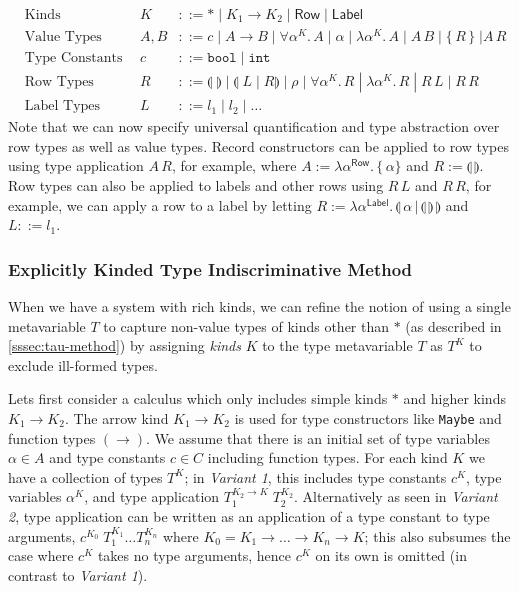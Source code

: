 \documentclass[acmsmall, 9pt]{article}
\begin{document}
\begin{enumerate}
  \begin{align*}
  &\text{Kinds} \quad &K &::= * \; | \; K_1 \rightarrow K_2 \; | \; \mathsf{Row} \; | \; \mathsf{Label}\\
  &\text{Value Types} \quad  &A, B &::= c \; | \; A \rightarrow B \; | \; \forall \alpha^K . \, A\; | \; \alpha \; | \; \lambda \alpha^K. \, A \; | \; A \, B \; | \; \{\,R\,\} \; | A \, R\\
  &\text{Type Constants} \quad &c &::= \texttt{bool} \; | \; \texttt{int}\\
  &\text{Row Types} \quad &R &::= \llparenthesis \; \rrparenthesis \; | \; \llparenthesis \; L \; | \; R \rrparenthesis \; | \; \rho \; | \; \forall \alpha^K . \, R \; | \; \lambda \alpha^K. \, R \; | \; R \, L \; | \; R \, R\\
  &\text{Label Types} \quad &L &::= l_1 \; | \; l_2 \; | \; \ldots
  \end{align*}
  Note that we can now specify universal quantification and type abstraction over row types as well as value types. Record constructors can be applied to row types using type application $A\,R$, for example, where $A := \lambda\alpha^\mathsf{Row}.\,\{\,\alpha\}$ and $R := \llparenthesis \, \rrparenthesis$. Row types can also be applied to labels and other rows using $R\,L$ and $R\,R$, for example, we can apply a row to a label by letting $R := \lambda \alpha^\mathsf{Label}. \, \llparenthesis \, \alpha \, | \, \llparenthesis \, \rrparenthesis \, \rrparenthesis$ and $L ::= l_1$.
\end{enumerate}

\subsubsection{\textbullet \; Explicitly Kinded Type Indiscriminative Method \cite{leijen2005extensible}}
When we have a system with rich kinds, we can refine the notion of using a single metavariable $T$ to capture non-value types of kinds other than $*$ (as described in \ref{sssec:tau-method}) by assigning \textit{kinds} $K$ to the type metavariable $T$ as $T^K$ to exclude ill-formed types.

Lets first consider a calculus which only includes simple kinds $*$ and higher kinds $K_1 \rightarrow K_2$. The arrow kind $K_1 \rightarrow K_2$ is used for type constructors like \texttt{Maybe} and function types $(\rightarrow)$. We assume that there is an initial set of type variables $\alpha \in A$ and type constants $c \in C$ including function types. For each kind $K$ we have a collection of types $T^K$; in \textit{Variant 1}, this includes type constants $c^K$, type variables $\alpha^K$, and type application $T_1^{K_2 \rightarrow K} \; T_2^{K_2}$. Alternatively as seen in \textit{Variant 2}, type application can be written as an application of a type constant to type arguments, $c^{K_0} \; T_1^{K_1} \ldots T_n^{K_n}$ where $K_0 = K_1 \rightarrow \ldots \rightarrow K_n \rightarrow K$; this also subsumes the case where $c^{K}$ takes no type arguments, hence $c^K$ on its own is omitted (in contrast to \textit{Variant 1}).
\end{document}

